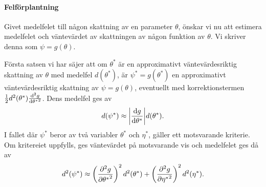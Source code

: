 \proof

\paragraph{Felförplantning}
Givet medelfelet till någon skattning av en parameter $\theta$, önskar vi nu att estimera medelfelet och väntevärdet av skattningen av någon funktion av $\theta$. Vi skriver denna som $\psi = g(\theta)$.

Första satsen vi har säjer att om $\theta^{*}$ är en approximativt väntevärdesriktig skattning av $\theta$ med medelfel $d(\theta^{*})$, är $\psi^{*} = g(\theta^{*})$ en approximativt väntevärdesriktig skattning av $\psi = g(\theta)$, eventuellt med korrektionstermen $\frac{1}{2}d^2(\theta^{*})\dv[2]{g}{{\theta^{*}}} (\theta^{*})$. Dens medelfel ges av
\begin{align*}
	d(\psi^{*})\approx\abs{\dv{g}{\theta^{*}} (\theta^{*})}d(\theta^{*}).
\end{align*}
I fallet där $\psi^{*}$ beror av två variabler $\theta^{*}$ och $\eta^{*}$, gäller ett motsvarande kriterie. Om kritereiet uppfylls, ges väntevärdet på motsvarande vis och medelfelet ges då av
\begin{align*}
	d^2(\psi^{*})\approx\left(\pdv[2]{g}{{\theta^{*}}} (\theta^{*}, \eta^{*})\right)^2d^2(\theta^{*}) + \left(\pdv[2]{g}{{\eta^{*}}} (\theta^{*}, \eta^{*})\right)^2d^2(\eta^{*}).
\end{align*}

\proof